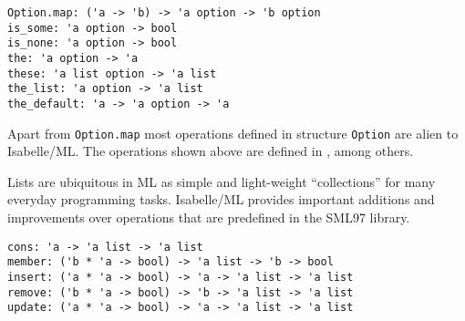 \begin{isabellebody}
\begin{isamarkuptext}
\begin{description}
  \end{description}%
\end{isamarkuptext}%
\isamarkuptrue%
%
\endisatagmlref
{\isafoldmlref}%
%
\isadelimmlref
%
\endisadelimmlref
%
\isamarkuptrue%
%
\isadelimmlref
%
\endisadelimmlref
%
\isatagmlref
%
\begin{isamarkuptext}%
\begin{mldecls}
  \verb|Option.map: ('a -> 'b) -> 'a option -> 'b option| \\
  \verb|is_some: 'a option -> bool| \\
  \verb|is_none: 'a option -> bool| \\
  \verb|the: 'a option -> 'a| \\
  \verb|these: 'a list option -> 'a list| \\
  \verb|the_list: 'a option -> 'a list| \\
  \verb|the_default: 'a -> 'a option -> 'a| \\
  \end{mldecls}%
\end{isamarkuptext}%
\isamarkuptrue%
%
\endisatagmlref
{\isafoldmlref}%
%
\isadelimmlref
%
\endisadelimmlref
%
\begin{isamarkuptext}%
Apart from \verb|Option.map| most operations defined in
  structure \verb|Option| are alien to Isabelle/ML.  The
  operations shown above are defined in \hyperlink{file.~~/src/Pure/General/basics.ML}{\mbox{}}, among others.%
\end{isamarkuptext}%
\isamarkuptrue%
%
\isamarkuptrue%
%
\begin{isamarkuptext}%
Lists are ubiquitous in ML as simple and light-weight
  ``collections'' for many everyday programming tasks.  Isabelle/ML
  provides important additions and improvements over operations that
  are predefined in the SML97 library.%
\end{isamarkuptext}%
\isamarkuptrue%
%
\isadelimmlref
%
\endisadelimmlref
%
\isatagmlref
%
\begin{isamarkuptext}%
\begin{mldecls}
  \verb|cons: 'a -> 'a list -> 'a list| \\
  \verb|member: ('b * 'a -> bool) -> 'a list -> 'b -> bool| \\
  \verb|insert: ('a * 'a -> bool) -> 'a -> 'a list -> 'a list| \\
  \verb|remove: ('b * 'a -> bool) -> 'b -> 'a list -> 'a list| \\
  \verb|update: ('a * 'a -> bool) -> 'a -> 'a list -> 'a list| \\
  \end{mldecls}


\end{isamarkuptext}
\end{isabellebody}
